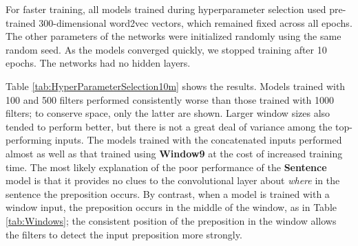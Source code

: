 For faster training, all models trained during hyperparameter selection used pre-trained 300-dimensional word2vec vectors, which remained fixed across all epochs. The other parameters of the networks were initialized randomly using the same random seed.  As the models converged quickly, we stopped training after 10 epochs.  The networks had no hidden layers. 


Table \ref{tab:HyperParameterSelection10m} shows the results.  Models trained with 100 and 500 filters performed consistently worse than those trained with 1000 filters; to conserve space, only the latter are shown.  Larger window sizes also tended to perform better, but there is not a great deal of variance among the top-performing inputs.  The models trained with the concatenated inputs performed almost as well as that trained using \textbf{Window9} at the cost of increased training time.
The most likely explanation of the poor performance of the \textbf{Sentence} model is that it provides no clues to the convolutional layer about \textit{where} in the sentence the preposition occurs.  By contrast, when a model is trained with a window input, the preposition occurs in the middle of the window, as in Table \ref{tab:Windows}; the consistent position of the preposition in the window allows the filters to detect the input preposition more strongly. 



